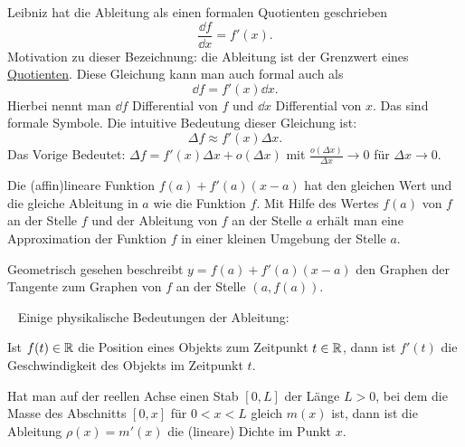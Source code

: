 \begin{bem} 
	Leibniz hat die Ableitung als einen formalen Quotienten geschrieben
	\[
		\frac{\dd f}{\dd x} = f'(x). 
	\]
 	Motivation zu dieser Bezeichnung: die Ableitung ist der Grenzwert eines \underline{Quotienten}. Diese Gleichung kann man auch formal auch als 
 	\[
 		\dd f = f'(x) \dd x.
 	\]
 	Hierbei nennt man $\dd f$ Differential von $f$ und $\dd x$ Differential von $x$. Das sind formale Symbole. Die intuitive Bedeutung dieser Gleichung ist: 
 	\[
 		\Delta f \approx f'(x) \Delta x.
 	\]
 	Das Vorige Bedeutet: $\Delta f = f'(x) \Delta x + o(\Delta x)$ mit $\frac{o(\Delta x)}{\Delta x} \to 0$ für $\Delta x \to 0$.  
\end{bem} 

\begin{bem}
	Die (affin)lineare Funktion $f(a) + f'(a) (x-a)$ hat den gleichen Wert und die gleiche Ableitung in $a$ wie die Funktion $f$. Mit Hilfe des Wertes $f(a)$ von $f$ an der Stelle $f$ und der Ableitung von $f$ an der Stelle $a$ erhält man eine Approximation der Funktion $f$ in einer kleinen Umgebung der Stelle $a$. 
	
	Geometrisch gesehen beschreibt $y = f(a) + f'(a) (x-a)$ den Graphen der Tangente zum Graphen von $f$ an der Stelle $(a,f(a))$. 
\end{bem} 

\begin{bem} {\ } Einige physikalische Bedeutungen der Ableitung:
	\begin{enuma}
		\item Ist $f(t) \in \mathbb{R}$ die Position eines Objekts zum Zeitpunkt $t \in \mathbb{R}$, dann ist $f'(t)$ die Geschwindigkeit des Objekts im Zeitpunkt $t$. 
		\item Hat man auf der reellen Achse einen Stab $[0,L]$ der Länge $L>0$, bei dem die Masse des Abschnitts $[0,x]$ für $0< x < L$ gleich $m(x)$ ist, dann ist die Ableitung $\rho(x) = m'(x)$ die (lineare) Dichte im Punkt $x$. 
	\end{enuma} 
\end{bem} 

